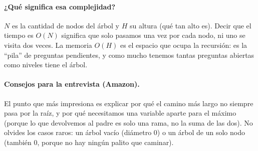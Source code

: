 

\paragraph{¿Qué significa esa complejidad?} $N$ es la cantidad de nodos del árbol y $H$ su altura (qué tan alto es). Decir que el tiempo es $O(N)$ significa que solo pasamos una vez por cada nodo, ni uno se visita dos veces. La memoria $O(H)$ es el espacio que ocupa la recursión: es la ``pila'' de preguntas pendientes, y como mucho tenemos tantas preguntas abiertas como niveles tiene el árbol.

\paragraph{Consejos para la entrevista (Amazon).} El punto que más impresiona es explicar por qué el camino más largo no siempre pasa por la raíz, y por qué necesitamos una variable aparte para el máximo (porque lo que devolvemos al padre es solo una rama, no la suma de las dos). No olvides los casos raros: un árbol vacío (diámetro 0) o un árbol de un solo nodo (también 0, porque no hay ningún palito que caminar).
